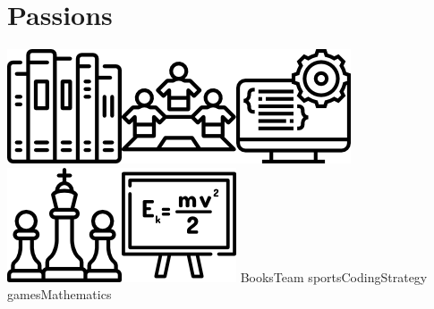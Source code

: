\documentclass[]{friggeri-cv}
\begin{document}
\section{Passions}
\includegraphics[scale=0.6]{img/books.png}\hspace{2.4 em}\includegraphics[scale=0.6]{img/team.png}\hspace{2.4 em}\includegraphics[scale=0.6]{img/programming.png}\hspace{2.4 em}\includegraphics[scale=0.6]{img/chess.png}\hspace{2.4 em}\includegraphics[scale=0.6]{img/formula.png}
\phantom{}\hspace{2 em}Books\hspace{4.2 em}Team sports\hspace{4.2 em}Coding\hspace{3.6 em}Strategy games\hspace{2.2 em}Mathematics
\end{document}
